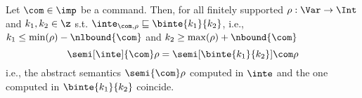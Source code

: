 
\begin{theorem}\label{th:bounded}
  Let \(\com\in \imp\) be a command. Then, for all finitely supported
  \(\rho : \Var \to \Int\) and \(k_1, k_2\in \z\) s.t.
  \(\inte_{\com,\rho} \sqsubseteq \binte{k_1}{k_2}\), i.e.,
  \(k_1 \leq \min(\rho) - \nlbound{\com}\) and
  \(k_2 \geq \max(\rho) + \nbound{\com}\)
  \begin{equation}\label{eq:equal}
    \semi[\inte]{\com}\rho = \semi[\binte{k_1}{k_2}]{\com}\rho
  \end{equation}
  i.e., the abstract semantics \(\semi{\com} \rho\)
  computed in \(\inte\) and the one computed in \(\binte{k_1}{k_2}\)
  coincide.
\end{theorem}

